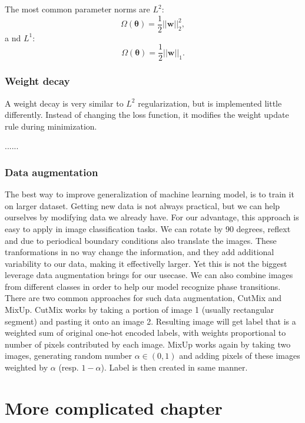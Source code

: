 The most common parameter norms are $L^2$:
\begin{equation}
 	\label{eq:l2-regularization}
 	\Omega(\bm{\theta}) = \dfrac{1}{2} ||\bm{w}||_2^2,
\end{equation} a
nd $L^1$:
\begin{equation}
	\label{eq:l1-regularization}
	\Omega(\bm{\theta}) = \dfrac{1}{2} ||\bm{w}||_1.
\end{equation} 


\subsection{Weight decay}
A weight decay is very similar to $L^2$ regularization, but is implemented little differently. Instead of changing the loss function, it modifies the weight update rule during minimization. 


......

\subsection{Data augmentation}

The best way to improve generalization of machine learning model, is to train it on larger dataset. Getting new data is not always practical, but we can help ourselves by modifying data we already have. For our advantage, this approach is easy to apply in image classification tasks. We can rotate by 90 degrees, reflext and due to periodical boundary conditions also translate the images. These tranformations in no way change the information, and they add additional variability to our data, making it effectivelly larger. Yet this is not the biggest leverage data augmentation brings for our usecase. We can also combine images from different classes in order to help our model recognize phase transitions. There are two common approaches for such data augmentation, CutMix and MixUp. CutMix works by taking a portion of image 1 (usually rectangular segment) and pasting it onto an image 2. Resulting image will get label that is a weighted sum of original one-hot encoded labels, with weights proportional to number of pixels contributed by each image. MixUp works again by taking two images, generating random number $\alpha \in (0, 1)$ and adding pixels of these images weighted by $\alpha$ (resp. $1 - \alpha$). Label is then created in same manner.


\chapter{More complicated chapter}
\label{chap:math}

